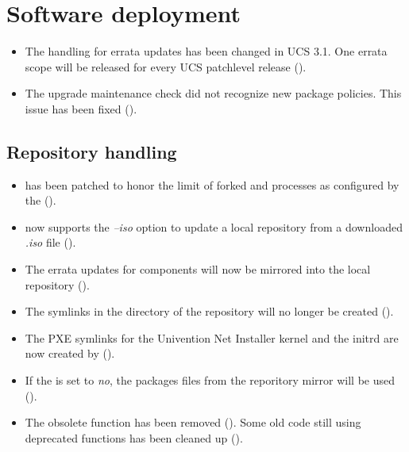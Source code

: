 \section{Software deployment}

\begin{itemize}
\item The handling for errata updates has been changed in UCS 3.1. One
errata scope will be released for every UCS patchlevel release
().

\item The upgrade maintenance check did not recognize new package
policies. This issue has been fixed ().

\end{itemize}

\subsection{Repository handling}
\begin{itemize}
\item {} has been patched to honor the limit of
  forked  and  processes
  as configured by the 
  ().
\item {} now supports the
  \emph{--iso} option to update a local repository from a downloaded
  \emph{.iso} file ().

\item The errata updates for components will now be mirrored into the
  local repository ().

\item The symlinks in the  directory of the repository will no
  longer be created ().

\item The PXE symlinks for the Univention Net Installer kernel and the
  initrd are now created by 
  ().

\item If the  is set to \emph{no}, the
packages files from the reporitory mirror will be used ().

\item The obsolete function
  has been removed (). Some old code still using
  deprecated functions has been cleaned up ().
\end{itemize}



